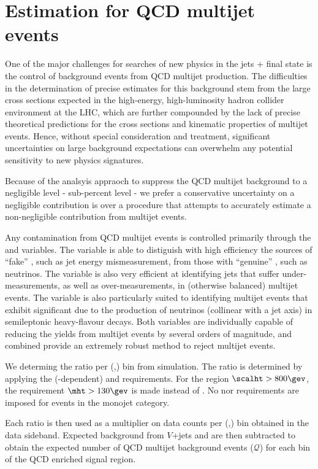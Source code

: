 \section{Estimation for QCD multijet events \label{sec:qcd}}

One of the major challenges for searches of new physics in the jets + \met final state is the control of background events from QCD multijet
production. The difficulties in the determination of precise estimates for this background stem from the large cross sections expected in the
high-energy, high-luminosity hadron collider environment at the LHC, which are further compounded by the lack of precise theoretical
predictions for the cross sections and kinematic properties of multijet events. Hence, without special consideration and treatment,
significant uncertainties on large background expectations can overwhelm any potential sensitivity to new physics signatures.


Because of the analsyis appraoch to suppress the QCD multijet background to a
negligible level -   sub-percent level -  we prefer a conservative uncertainty on a negligible contribution is
 over a procedure that attempts to accurately estimate a
non-negligible contribution from multijet events. 


Any contamination from QCD multijet events is controlled primarily through the \alphat and \bdphi variables. The \alphat variable is able
to distiguish with high efficiency the sources of ``fake'' \met, such as jet energy mismeasurement, from those with ``genuine'' \met, such
as neutrinos. The \bdphi variable is also very efficient at identifying jets that suffer under-measurements, as well as
over-measurements, in (otherwise balanced) multijet events. The variable is also particularly suited to identifying multijet events
that exhibit significant \met due to the production of neutrinos (collinear with a jet axis) in semileptonic heavy-flavour decays. Both
variables are individually capable of reducing the yields from multijet events by several orders of magnitude, and combined provide
an extremely robust method to reject multijet events. 

We determing the ratio \rmhtmet per (\njet,\scalht) bin from simulation. The ratio is determined by applying the (\scalht-dependent)
\alphat and \bdphi requirements. For the region $\scalht > 800\gev$, the requirement $\mht > 130\gev$ is made instead of \alphat. 
No \alphat nor \mht requirements are imposed for events in the monojet category.

Each ratio \rmhtmet is then used as a multiplier on data counts per (\njet,\scalht) bin obtained in the
\mhtmet data sideband. Expected background from $V$+jets and \ttbar are then subtracted to obtain the expected number of 
QCD multijet background events ($\mathcal{Q}$) for each bin of the QCD enriched signal region.

